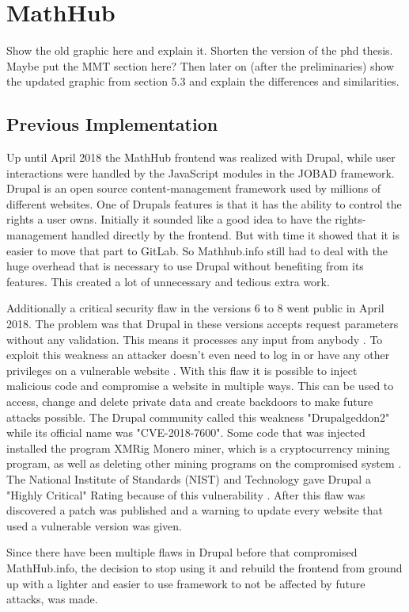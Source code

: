 \documentclass[11pt,a4paper]{article}
\begin{document}
\section{MathHub} \label{mathhub}
Show the old graphic here and explain it. Shorten the version of the phd thesis.
Maybe put the MMT section here?
Then later on (after the preliminaries) show the updated graphic from section 5.3 and explain the differences and similarities.
\subsection{Previous Implementation}
Up until April 2018 the MathHub frontend was realized with Drupal\cite{comp}, while user interactions were handled by the JavaScript modules in the JOBAD framework.
Drupal is an open source content-management framework used by millions of different websites.
One of Drupals features is that it has the ability to control the rights a user owns.
Initially it sounded like a good idea to have the rights-management handled directly by the frontend.
But with time it showed that it is easier to move that part to GitLab.
So Mathhub.info still had to deal with the huge overhead that is necessary to use Drupal without benefiting from its features.
This created a lot of unnecessary and tedious extra work.	

Additionally a critical security flaw in the versions 6 to 8 went public in April 2018.
The problem was that Drupal in these versions accepts request parameters without any validation.
This means it processes any input from anybody \cite{zdnet}.
To exploit this weakness an attacker doesn't even need to log in or have any other privileges on a vulnerable website \cite{register}.
With this flaw it is possible to inject malicious code and compromise a website in multiple ways.
This can be used to access, change and delete private data and create backdoors to make future attacks possible.
The Drupal community called this weakness "Drupalgeddon2" while its official name was "CVE-2018-7600".
Some code that was injected installed the program XMRig Monero miner, which is a cryptocurrency mining program, as well as deleting other mining programs on the compromised system \cite{hacker}.
The National Institute of Standards (NIST) and Technology gave Drupal a "Highly Critical" Rating because of this vulnerability \cite{nist}.
 After this flaw was discovered a patch was published and a warning to update every website that used a vulnerable version was given.
	
Since there have been multiple flaws in Drupal before that compromised MathHub.info, the decision to stop using it and rebuild the frontend from ground up with a lighter and easier to use framework to not be affected by future attacks, was made.
\end{document}
